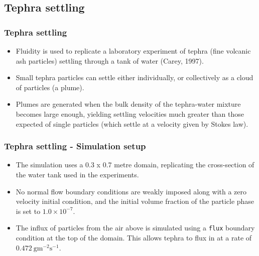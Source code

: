 \subsection{Tephra settling}

\begin{frame}
  \frametitle{Tephra settling}
  \begin{itemize}
    \item Fluidity is used to replicate a laboratory experiment of tephra (fine volcanic ash
particles) settling through a tank of water (Carey, 1997).\newline
    \item Small tephra particles can settle either individually, or collectively as a cloud of particles (a plume).\newline
    \item Plumes are generated when the bulk density of the tephra-water mixture becomes large enough, yielding settling velocities much greater than those expected of single particles (which settle at a velocity given by Stokes law).
  \end{itemize}
\end{frame}

\begin{frame}
  \frametitle{Tephra settling - Simulation setup}
  \begin{itemize}
    \item The simulation uses a 0.3 x 0.7 metre domain, replicating the cross-section of the water tank used in the experiments.\newline
    \item No normal flow boundary conditions are weakly imposed along with a zero velocity initial condition, and the initial volume fraction of the particle phase is set to $1.0 \times 10^{-7}$.\newline
    \item The influx of particles from the air above is simulated using a \texttt{flux} boundary condition at the top of the domain. This allows tephra to flux in at a rate of $0.472\ \mathrm{gm^{-2}s^{-1}}$.
  \end{itemize}
\end{frame}

